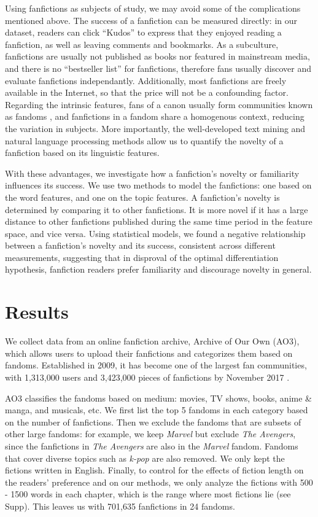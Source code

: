 \documentclass[a4paper]{article}
\begin{document}
Using fanfictions as subjects of study, we may avoid some of the complications mentioned above. The success of a fanfiction can be measured directly: in our dataset, readers can click ``Kudos'' to express that they enjoyed reading a fanfiction, as well as leaving comments and bookmarks. As a subculture, fanfictions are usually not published as books nor featured in mainstream media, and there is no ``bestseller list'' for fanfictions, therefore fans usually discover and evaluate fanfictions independantly. Additionally, most fanfictions are freely available in the Internet, so that the price will not be a confounding factor. Regarding the intrinsic features, fans of a canon usually form communities known as fandoms \cite{wiki:fandom}, and fanfictions in a fandom share a homogenous context, reducing the variation in subjects. More importantly, the well-developed text mining and natural language processing methods allow us to quantify the novelty of a fanfiction based on its linguistic features.

With these advantages, we investigate how a fanfiction's novelty or familiarity influences its success. We use two methods to model the fanfictions: one based on the word features, and one on the topic features. A fanfiction's novelty is determined by comparing it to other fanfictions. It is more novel if it has a large distance to other fanfictions published during the same time period in the feature space, and vice versa. Using statistical models, we found a negative relationship between a fanfiction's novelty and its success, consistent across different measurements, suggesting that in disproval of the optimal differentiation hypothesis, fanfiction readers prefer familiarity and discourage novelty in general.


\section*{Results} 
We collect data from an online fanfiction archive, Archive of Our Own (AO3), which allows users to upload their fanfictions and categorizes them based on fandoms. Established in 2009, it has become one of the largest fan communities, with 1,313,000 users and 3,423,000 pieces of fanfictions by November 2017 \cite{ao3stats}.

AO3 classifies the fandoms based on medium: movies, TV shows, books, anime \& manga, and musicals, etc. We first list the top 5 fandoms in each category based on the number of fanfictions. Then we exclude the fandoms that are subsets of other large fandoms: for example, we keep \emph{Marvel} but exclude \emph{The Avengers}, since the fanfictions in \emph{The Avengers} are also in the \emph{Marvel} fandom. Fandoms that cover diverse topics such as \emph{k-pop} are also removed. We only kept the fictions written in English. Finally, to control for the effects of fiction length on the readers' preference and on our methods, we only analyze the fictions with 500 - 1500 words in each chapter, which is the range where most fictions lie (see Supp). This leaves us with 701,635 fanfictions in 24 fandoms.
\end{document}
